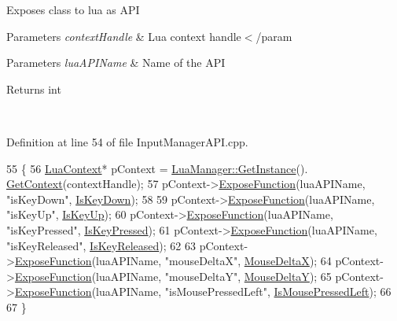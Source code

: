 Exposes class to lua as A\+PI 


\begin{DoxyParams}{Parameters}
{\em context\+Handle} & Lua context handle$<$/param 
\begin{DoxyParams}{Parameters}
{\em lua\+A\+P\+I\+Name} & Name of the A\+PI\\
\hline
\end{DoxyParams}
\begin{DoxyReturn}{Returns}
int
\end{DoxyReturn}
\\
\hline
\end{DoxyParams}


Definition at line 54 of file Input\+Manager\+A\+P\+I.\+cpp.


\begin{DoxyCode}
55 \{
56     \hyperlink{class_lua_context}{LuaContext}* pContext = \hyperlink{class_singleton_a74f32751d99bf3cc95fe17aba11f4b07}{LuaManager::GetInstance}().
      \hyperlink{class_lua_manager_a68592b46a59219d130cf4f637c977378}{GetContext}(contextHandle);
57     pContext->\hyperlink{class_lua_context_a2229908b6b329ed67105f1be7409cb3f}{ExposeFunction}(luaAPIName, \textcolor{stringliteral}{"isKeyDown"}, \hyperlink{class_input_manager_a_p_i_aec8bc199cc78f455eb389a17354da2f3}{IsKeyDown});
58 
59     pContext->\hyperlink{class_lua_context_a2229908b6b329ed67105f1be7409cb3f}{ExposeFunction}(luaAPIName, \textcolor{stringliteral}{"isKeyUp"}, \hyperlink{class_input_manager_a_p_i_aebcfc59983f58615bcc0e4bb3540343a}{IsKeyUp});
60     pContext->\hyperlink{class_lua_context_a2229908b6b329ed67105f1be7409cb3f}{ExposeFunction}(luaAPIName, \textcolor{stringliteral}{"isKeyPressed"}, 
      \hyperlink{class_input_manager_a_p_i_ae9d2da474cf31a7d36bbdc1b2e787e1d}{IsKeyPressed});
61     pContext->\hyperlink{class_lua_context_a2229908b6b329ed67105f1be7409cb3f}{ExposeFunction}(luaAPIName, \textcolor{stringliteral}{"isKeyReleased"}, 
      \hyperlink{class_input_manager_a_p_i_a43d36f6532fa59feecd8c8b720ed4d82}{IsKeyReleased});
62 
63     pContext->\hyperlink{class_lua_context_a2229908b6b329ed67105f1be7409cb3f}{ExposeFunction}(luaAPIName, \textcolor{stringliteral}{"mouseDeltaX"}, 
      \hyperlink{class_input_manager_a_p_i_a958df6a0f9d242cbcab8f5e8451dcc52}{MouseDeltaX});
64     pContext->\hyperlink{class_lua_context_a2229908b6b329ed67105f1be7409cb3f}{ExposeFunction}(luaAPIName, \textcolor{stringliteral}{"mouseDeltaY"}, 
      \hyperlink{class_input_manager_a_p_i_a560f8c659b7b0b90e017e1ca415dcff7}{MouseDeltaY});
65     pContext->\hyperlink{class_lua_context_a2229908b6b329ed67105f1be7409cb3f}{ExposeFunction}(luaAPIName, \textcolor{stringliteral}{"isMousePressedLeft"}, 
      \hyperlink{class_input_manager_a_p_i_a017de1644ac86b880072af511bba72f1}{IsMousePressedLeft});
66 
67 \}\end{DoxyCode}
